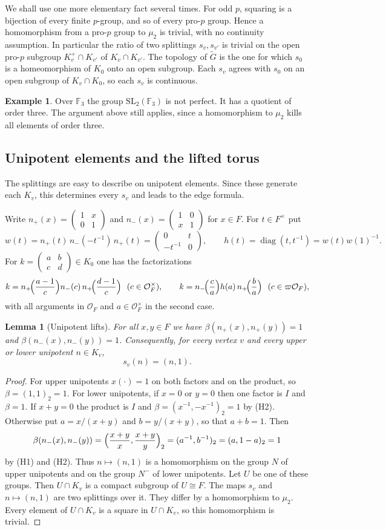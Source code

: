 \documentclass[12pt,letterpaper]{article}
\numberwithin{equation}{section}
\newtheorem{lemma}[theorem]{Lemma}
\theoremstyle{definition}
\newtheorem{example}[theorem]{Example}
\theoremstyle{remark}
\newcommand{\OO}{\mathcal O_F}
\newcommand{\Mp}{\widetilde G}
\newcommand{\diag}{\operatorname{diag}}
\newcommand{\np}{n_{+}}
\newcommand{\nm}{n_{-}}
\newcommand{\sm}[4]{\left(\begin{smallmatrix}#1&#2\\#3&#4\end{smallmatrix}\right)}
\begin{document}
We shall use one more elementary fact several times. For odd $p$, squaring is a bijection of every finite $p$-group, and so of every pro-$p$ group. Hence a homomorphism from a pro-$p$ group to $\mu_2$ is trivial, with no continuity assumption. In particular the ratio of two splittings $s_v,s_{v'}$ is trivial on the open pro-$p$ subgroup $K_v^+\cap K_{v'}$ of $K_v\cap K_{v'}$. The topology of $\Mp$ is the one for which $s_0$ is a homeomorphism of $K_0$ onto an open subgroup. Each $s_v$ agrees with $s_0$ on an open subgroup of $K_v\cap K_0$, so each $s_v$ is continuous.

\begin{example}
Over $\mathbb F_3$ the group $\mathrm{SL}_2(\mathbb F_3)$ is not perfect. It has a quotient of order three. The argument above still applies, since a homomorphism to $\mu_2$ kills all elements of order three.
\end{example}

\subsection{Unipotent elements and the lifted torus}
The splittings are easy to describe on unipotent elements. Since these generate each $K_v$, this determines every $s_v$ and leads to the edge formula.

Write $\np(x)=\sm1x01$ and $\nm(x)=\sm10x1$ for $x\in F$. For $t\in F^\times$ put
\[
 w(t)=\np(t)\,\nm(-t^{-1})\,\np(t)=\sm{0}{t}{-t^{-1}}{0},
 \qquad h(t)=\diag(t,t^{-1})=w(t)w(1)^{-1}.
\]
For $k=\sm abcd\in K_0$ one has the factorizations
\begin{equation}\label{eq:word}
 k=\np\!\Bigl(\frac{a-1}{c}\Bigr)\nm(c)\,\np\!\Bigl(\frac{d-1}{c}\Bigr)\ \ (c\in\OO^\times),
 \qquad
 k=\nm\!\Bigl(\frac ca\Bigr)h(a)\,\np\!\Bigl(\frac ba\Bigr)\ \ (c\in\varpi\OO),
\end{equation}
with all arguments in $\OO$ and $a\in\OO^\times$ in the second case.

\begin{lemma}[Unipotent lifts]\label{lem:unip}
For all $x,y\in F$ we have $\beta(\np(x),\np(y))=1$ and $\beta(\nm(x),\nm(y))=1$. Consequently, for every vertex $v$ and every upper or lower unipotent $n\in K_v$,
\[
 s_v(n)=(n,1).
\]
\end{lemma}
\begin{proof}
For upper unipotents $x(\cdot)=1$ on both factors and on the product, so $\beta=(1,1)_2=1$. For lower unipotents, if $x=0$ or $y=0$ then one factor is $I$ and $\beta=1$. If $x+y=0$ the product is $I$ and $\beta=(x^{-1},-x^{-1})_2=1$ by (H2). Otherwise put $a=x/(x+y)$ and $b=y/(x+y)$, so that $a+b=1$. Then
\[
 \beta(\nm(x),\nm(y))=\Bigl(\frac{x+y}{x},\frac{x+y}{y}\Bigr)_2=(a^{-1},b^{-1})_2=(a,1-a)_2=1
\]
by (H1) and (H2). Thus $n\mapsto(n,1)$ is a homomorphism on the group $N$ of upper unipotents and on the group $N^-$ of lower unipotents. Let $U$ be one of these groups. Then $U\cap K_v$ is a compact subgroup of $U\cong F$. The maps $s_v$ and $n\mapsto(n,1)$ are two splittings over it. They differ by a homomorphism to $\mu_2$. Every element of $U\cap K_v$ is a square in $U\cap K_v$, so this homomorphism is trivial.
\end{proof}
\end{document}

